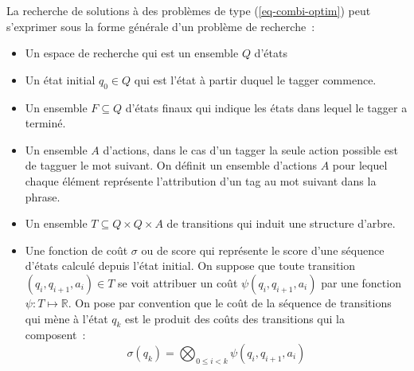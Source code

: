 \documentclass[11pt,openany]{book}
\begin{document}
La recherche de solutions à des problèmes de type (\ref{eq-combi-optim}) 
peut s'exprimer sous la forme générale d'un problème de recherche~:
\begin{itemize}
\item Un espace de recherche qui est un ensemble $Q$ d'états
\item Un état initial $q_0 \in Q$ qui est l'état à partir duquel le tagger commence.    
\item Un ensemble $F\subseteq Q$ d'états finaux qui indique les états dans lequel le tagger a terminé.
\item Un ensemble $A$ d'actions, dans le cas d'un tagger la seule action possible est de tagguer le mot suivant. On définit un ensemble d'actions $A$ pour lequel chaque élément représente l'attribution d'un tag au mot suivant dans la phrase.
\item Un ensemble $T\subseteq Q\times Q \times A$ de transitions qui induit une structure d'arbre.
\item Une fonction de coût $\sigma$ ou de score qui représente le score d'une séquence d'états calculé depuis l'état initial. On suppose que toute transition  $(q_i,q_{i+1},a_i) \in T$ se voit attribuer un coût $\psi(q_i,q_{i+1},a_i)$ par une fonction $\psi: T \mapsto \mathbb{R}$. On pose par convention que le coût de la séquence de transitions qui mène à l'état $q_k$ est le produit des coûts des transitions qui la composent~: 
\begin{displaymath}
\sigma(q_k) = \bigotimes_{0\leq i < k} \psi(q_i,q_{i+1},a_i)
\end{displaymath}
\end{itemize}
\end{document}
